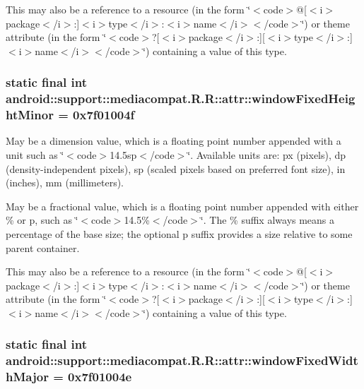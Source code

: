 This may also be a reference to a resource (in the form \char`\"{}$<$code$>$@\mbox{[}$<$i$>$package$<$/i$>$:\mbox{]}$<$i$>$type$<$/i$>$:$<$i$>$name$<$/i$>$$<$/code$>$\char`\"{}) or theme attribute (in the form \char`\"{}$<$code$>$?\mbox{[}$<$i$>$package$<$/i$>$:\mbox{]}\mbox{[}$<$i$>$type$<$/i$>$:\mbox{]}$<$i$>$name$<$/i$>$$<$/code$>$\char`\"{}) containing a value of this type. \hypertarget{classandroid_1_1support_1_1mediacompat_1_1_r_1_1attr_f4fc1b03414c7b7ed9de58706837f97d}{
\subsubsection[{windowFixedHeightMinor}]{\setlength{\rightskip}{0pt plus 5cm}static final int android::support::mediacompat.R.R::attr::windowFixedHeightMinor = 0x7f01004f}}
\label{classandroid_1_1support_1_1mediacompat_1_1_r_1_1attr_f4fc1b03414c7b7ed9de58706837f97d}


May be a dimension value, which is a floating point number appended with a unit such as \char`\"{}$<$code$>$14.5sp$<$/code$>$\char`\"{}. Available units are: px (pixels), dp (density-independent pixels), sp (scaled pixels based on preferred font size), in (inches), mm (millimeters). 

May be a fractional value, which is a floating point number appended with either \% or p, such as \char`\"{}$<$code$>$14.5\%$<$/code$>$\char`\"{}. The \% suffix always means a percentage of the base size; the optional p suffix provides a size relative to some parent container. 

This may also be a reference to a resource (in the form \char`\"{}$<$code$>$@\mbox{[}$<$i$>$package$<$/i$>$:\mbox{]}$<$i$>$type$<$/i$>$:$<$i$>$name$<$/i$>$$<$/code$>$\char`\"{}) or theme attribute (in the form \char`\"{}$<$code$>$?\mbox{[}$<$i$>$package$<$/i$>$:\mbox{]}\mbox{[}$<$i$>$type$<$/i$>$:\mbox{]}$<$i$>$name$<$/i$>$$<$/code$>$\char`\"{}) containing a value of this type. \hypertarget{classandroid_1_1support_1_1mediacompat_1_1_r_1_1attr_fae8f2514c9828ab5a56cf89d37ffb48}{
\subsubsection[{windowFixedWidthMajor}]{\setlength{\rightskip}{0pt plus 5cm}static final int android::support::mediacompat.R.R::attr::windowFixedWidthMajor = 0x7f01004e}}
\label{classandroid_1_1support_1_1mediacompat_1_1_r_1_1attr_fae8f2514c9828ab5a56cf89d37ffb48}


